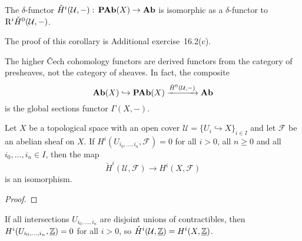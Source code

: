\begin{cor}
The \(\delta\)-functor \(\check{H}^i(\mathcal U,-)\colon\catAbelianPresheaf(X)\to\catAbelianGroup\) is isomorphic as a \(\delta\)-functor to \(\mathrm{R}^i\check{H}^0(\mathcal U,-)\).
\end{cor}
The proof of this corollary is Additional exercise~16.2(c).

\begin{rmk}
The higher Čech cohomology functors are derived functors from the category of presheaves, not the category of sheaves.
In fact, the composite
\[ \operatorname{\mathbf{Ab}}(X)\hookrightarrow\operatorname{\mathbf{PAb}}(X)\xrightarrow{\check{H}^0(\mathcal U,-)}\mathbf{Ab} \]
is the global sections functor \(\Gamma(X,-)\).
\end{rmk}


\begin{cor}\label{cor:Čech-cohomology-vanishing-intersections}
Let \(X\) be a topological space with an open cover \(\mathcal U=\{U_i\hookrightarrow X\}_{i\in I}\) and let \(\mathcal F\) be an abelian sheaf on \(X\).
If \(H^i(U_{i_0,\ldots,i_n},\mathcal F)=0\) for all \(i>0\), all \(n\geq 0\) and all \(i_0,\ldots,i_n\in I\), then the map
\[ \check{H}^i(\mathcal U,\mathcal F) \to H^i(X,\mathcal F) \]
is an isomorphism.
\end{cor}
\begin{proof}
\end{proof}

\begin{exmp}\label{exmp:Čech-cohomology-intersections-disjoint-unions-of-contractibles}
If all intersections \(U_{i_0,\ldots,i_n}\) are disjoint unions of contractibles, then \(H^i(U_{i_0,\ldots,i_n},\underline{\mathbb{Z}})=0\) for all \(i>0\), so \(\check{H}^i(\mathcal U,\underline{\mathbb{Z}})=H^i(X,\underline{\mathbb{Z}})\).
\end{exmp}

